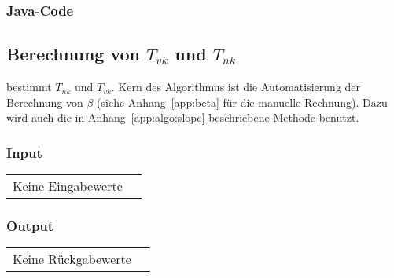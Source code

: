 \clearpage
\subsubsection*{Java-Code}



\clearpage
\subsection{Berechnung von $T_{vk}$ und $T_{nk}$}
\label{app:algo:tnktvk}

    bestimmt   $T_{nk}$    und   $T_{vk}$. Kern    des
Algorithmus  ist  die  Automatisierung   der  Berechnung  von  $\beta$  (siehe
Anhang~\ref{app:beta}  f\"ur die  manuelle  Rechnung). Dazu wird  auch die  in
Anhang~\ref{app:algo:slope} beschriebene Methode  benutzt.

\subsubsection*{Input}

\begin{tabular}{p{40mm}l}
    Keine Eingabewerte &
\end{tabular}

\subsubsection*{Output}
\begin{tabular}{p{40mm}l}
    Keine R\"uckgabewerte &
\end{tabular}

